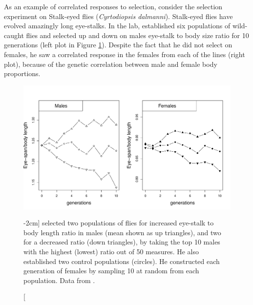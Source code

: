 As an example of correlated responses to selection, consider the  \citet{wilkinson:93} selection experiment on Stalk-eyed
 flies ({\it Cyrtodiopsis  dalmanni}). Stalk-eyed flies have evolved amazingly long eye-stalks. In the lab, \citeauthor{wilkinson:93} established six populations of
 wild-caught flies and selected up and down on males eye-stalk to body
 size ratio for 10 generations (left plot in Figure
 \ref{fig:Stalk_eyed_response}). Despite the fact that he did not
 select on females, he saw a correlated response in the females from
 each of the lines (right plot), because of the genetic correlation
 between male and female body proportions. 

\begin{figure}
\begin{center}
\includegraphics[width= \textwidth]{Journal_figs/Quant_gen/stalk_eyed_flies/stalk_eyed_flies_response.pdf}
\end{center}
\caption[][-2cm]{ \citeauthor{wilkinson:93} selected two populations of flies for
 increased eye-stalk to body length ratio in males (mean shown as
 up triangles), and two for a
 decreased ratio (down triangles), by taking the top 10 males with the highest (lowest)
 ratio out of 50 measures. He also established two control populations
 (circles). He constructed each generation of females by sampling 10
 at random from each population.  Data from \citet{wilkinson:93}.  } \label{fig:Stalk_eyed_response}   %
\end{figure}

